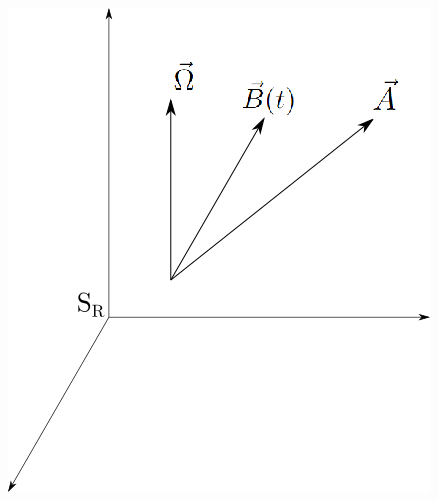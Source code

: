 \begin{minipage}{0.49\textwidth}
    \vspace{-2ex}
    \begin{center}
        \includegraphics[width=0.9\linewidth]{assets/figure-1.png}
        \label{fig:fig1}
    \end{center}
\end{minipage}

